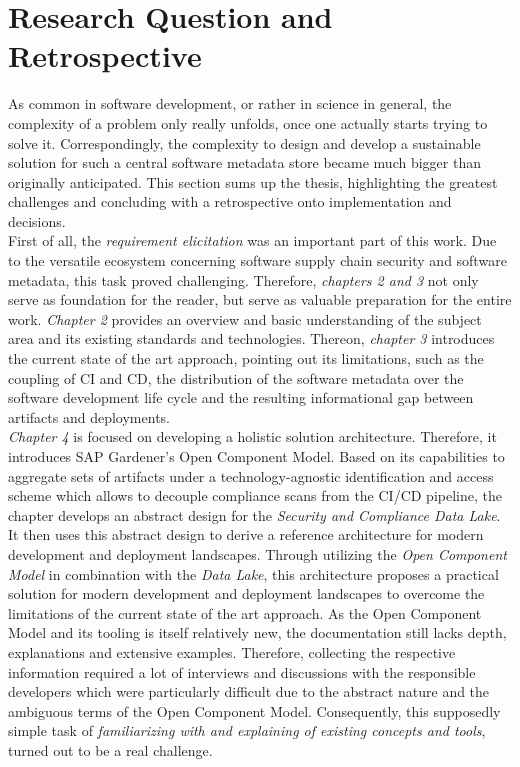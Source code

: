 \section{Research Question and Retrospective}
As common in software development, or rather in science in general, the complexity of a problem only really unfolds, once one actually starts trying to solve it. Correspondingly, the complexity to design and develop a sustainable solution for such a central software metadata store became much bigger than originally anticipated. This section sums up the thesis, highlighting the greatest challenges and concluding with a retrospective onto implementation and decisions.\\

First of all, the \emph{requirement elicitation} was an important part of this work. Due to the versatile ecosystem concerning software supply chain security and software metadata, this task proved challenging. Therefore, \emph{chapters 2 and 3} not only serve as foundation for the reader, but serve as valuable preparation for the entire work. \emph{Chapter 2} provides an overview and basic understanding of the subject area and its existing standards and technologies. Thereon, \emph{chapter 3} introduces the current state of the art approach, pointing out its limitations, such as the coupling of CI and CD, the distribution of the software metadata over the software development life cycle and the resulting informational gap between artifacts and deployments.\\

\emph{Chapter 4} is focused on developing a holistic solution architecture. Therefore, it introduces SAP Gardener's Open Component Model. Based on its capabilities to aggregate sets of artifacts under a technology-agnostic identification and access scheme which allows to decouple compliance scans from the CI/CD pipeline, the chapter develops an abstract design for the \emph{Security and Compliance Data Lake}. It then uses this abstract design to derive a reference architecture for modern development and deployment landscapes. Through utilizing the \emph{Open Component Model} in combination with the \emph{Data Lake}, this architecture proposes a practical solution for modern development and deployment landscapes to overcome the limitations of the current state of the art approach. As the Open Component Model and its tooling is itself relatively new, the documentation still lacks depth, explanations and extensive examples. Therefore, collecting the respective information required a lot of interviews and discussions with the responsible developers which were particularly difficult due to the abstract nature and the ambiguous terms of the Open Component Model. Consequently, this supposedly simple task of \emph{familiarizing with and explaining of existing concepts and tools}, turned out to be a real challenge.\\   

